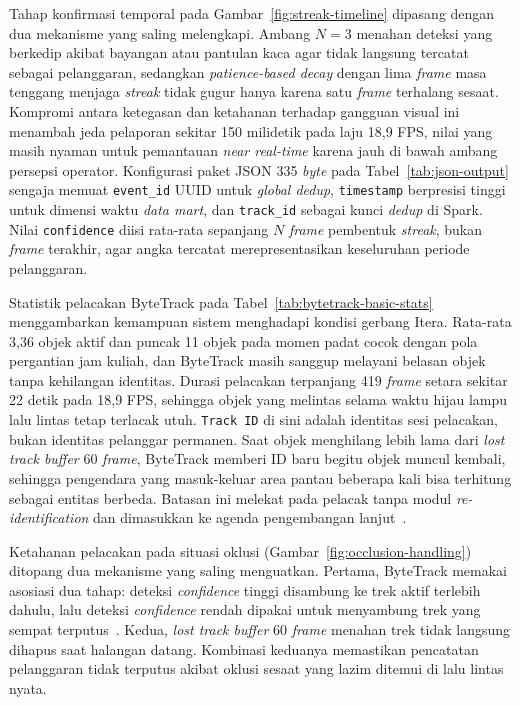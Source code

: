 Tahap konfirmasi temporal pada Gambar~\ref{fig:streak-timeline} dipasang dengan dua mekanisme yang saling melengkapi. Ambang $N=3$ menahan deteksi yang berkedip akibat bayangan atau pantulan kaca agar tidak langsung tercatat sebagai pelanggaran, sedangkan \textit{patience-based decay} dengan lima \textit{frame} masa tenggang menjaga \textit{streak} tidak gugur hanya karena satu \textit{frame} terhalang sesaat. Kompromi antara ketegasan dan ketahanan terhadap gangguan visual ini menambah jeda pelaporan sekitar 150 milidetik pada laju 18,9 FPS, nilai yang masih nyaman untuk pemantauan \textit{near real-time} karena jauh di bawah ambang persepsi operator. Konfigurasi paket JSON 335 \textit{byte} pada Tabel~\ref{tab:json-output} sengaja memuat \texttt{event\_id} UUID untuk \textit{global dedup}, \texttt{timestamp} berpresisi tinggi untuk dimensi waktu \textit{data mart}, dan \texttt{track\_id} sebagai kunci \textit{dedup} di Spark. Nilai \texttt{confidence} diisi rata-rata sepanjang $N$ \textit{frame} pembentuk \textit{streak}, bukan \textit{frame} terakhir, agar angka tercatat merepresentasikan keseluruhan periode pelanggaran.

Statistik pelacakan ByteTrack pada Tabel~\ref{tab:bytetrack-basic-stats} menggambarkan kemampuan sistem menghadapi kondisi gerbang Itera. Rata-rata 3,36 objek aktif dan puncak 11 objek pada momen padat cocok dengan pola pergantian jam kuliah, dan ByteTrack masih sanggup melayani belasan objek tanpa kehilangan identitas. Durasi pelacakan terpanjang 419 \textit{frame} setara sekitar 22 detik pada 18,9 FPS, sehingga objek yang melintas selama waktu hijau lampu lalu lintas tetap terlacak utuh. \texttt{Track ID} di sini adalah identitas sesi pelacakan, bukan identitas pelanggar permanen. Saat objek menghilang lebih lama dari \textit{lost track buffer} 60 \textit{frame}, ByteTrack memberi ID baru begitu objek muncul kembali, sehingga pengendara yang masuk-keluar area pantau beberapa kali bisa terhitung sebagai entitas berbeda. Batasan ini melekat pada pelacak tanpa modul \textit{re-identification} dan dimasukkan ke agenda pengembangan lanjut~\cite{zhang2022bytetrack_eccv}.

Ketahanan pelacakan pada situasi oklusi (Gambar~\ref{fig:occlusion-handling}) ditopang dua mekanisme yang saling menguatkan. Pertama, ByteTrack memakai asosiasi dua tahap: deteksi \textit{confidence} tinggi disambung ke trek aktif terlebih dahulu, lalu deteksi \textit{confidence} rendah dipakai untuk menyambung trek yang sempat terputus~\cite{ma2023adaptivebytetrack}. Kedua, \textit{lost track buffer} 60 \textit{frame} menahan trek tidak langsung dihapus saat halangan datang. Kombinasi keduanya memastikan pencatatan pelanggaran tidak terputus akibat oklusi sesaat yang lazim ditemui di lalu lintas nyata.

